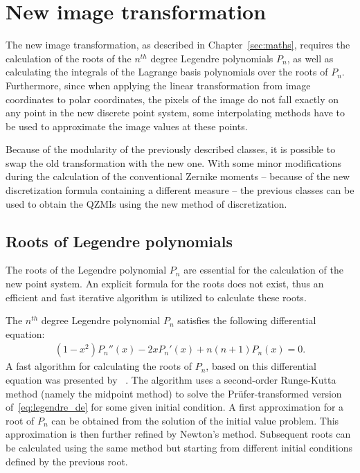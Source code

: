 \section{New image transformation}\label{sec:new_trans}
The new image transformation, as described in Chapter~\ref{sec:maths}, requires the calculation of the roots of the $n^{th}$ degree Legendre polynomials $P_n$, as well as calculating the integrals of the Lagrange basis polynomials over the roots of $P_n$. Furthermore, since when applying the linear transformation from image coordinates to polar coordinates, the pixels of the image do not fall exactly on any point in the new discrete point system, some interpolating methods have to be used to approximate the image values at these points.

Because of the modularity of the previously described classes, it is possible to swap the old transformation with the new one. With some minor modifications during the calculation of the conventional Zernike moments -- because of the new discretization formula containing a different measure -- the previous classes can be used to obtain the QZMIs using the new method of discretization.

\subsection{Roots of Legendre polynomials}
The roots of the Legendre polynomial $P_n$ are essential for the calculation of the new point system. An explicit formula for the roots does not exist, thus an efficient and fast iterative algorithm is utilized to calculate these roots.

The $n^{th}$ degree Legendre polynomial $P_n$ satisfies the following differential equation:
\begin{gather}
    (1-x^2)P_n''(x) - 2xP_n'(x) + n(n+1)P_n(x) = 0.\label{eq:legendre_de}
\end{gather}
A fast algorithm for calculating the roots of $P_n$, based on this differential equation was presented by \citeauthor{legendre_algo}~\cite{legendre_algo}. The algorithm uses a second-order Runge-Kutta method (namely the midpoint method) to solve the Prüfer-transformed version of~\eqref{eq:legendre_de} for some given initial condition. A first approximation for a root of $P_n$ can be obtained from the solution of the initial value problem. This approximation is then further refined by Newton's method.
Subsequent roots can be calculated using the same method but starting from different initial conditions defined by the previous root.


